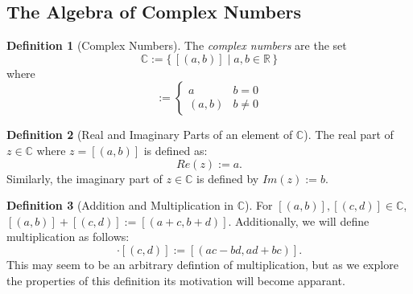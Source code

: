 \documentclass[hidelinks,12pt]{article}
\theoremstyle{definition}
\newtheorem{definition}{Definition}[section]
\begin{document}
  \subsection{The Algebra of Complex Numbers}
    \begin{definition} [Complex Numbers]
      \label{def:cmpnum}
      The \emph{complex numbers} are the set
      \begin{equation*}
        \mathbb{C} := \{\,[(a,b)] \mid a,b \in \mathbb{R}\,\}
      \end{equation*}
      where
      \begin{equation*}
        [(a,b)] :=
        \begin{cases}
          a & b = 0 \\
          (a,b) & b \neq 0
        \end{cases}
      \end{equation*}
    \end{definition}
    \begin{definition} [Real and Imaginary Parts of an element of $\mathbb{C}$]
      The real part of $z \in \mathbb{C}$ where $z=[(a,b)]$ is defined as:
      \begin{equation*}
        Re(z) := a.
      \end{equation*}
      Similarly, the imaginary part of $z \in \mathbb{C}$ is defined by $Im(z):=b$.
    \end{definition}
    \begin{definition} [Addition and Multiplication in $\mathbb{C}$]
      For $[(a,b)],[(c,d)]\in \mathbb{C}$, $[(a,b)]+[(c,d)]:=[(a+c,b+d)]$. Additionally, we will define multiplication as follows:
      \begin{equation*}
        [(a,b)]\cdot[(c,d)] := [(ac - bd, ad + bc)].
      \end{equation*}
      This may seem to be an arbitrary defintion of multiplication, but as we explore the properties of this definition its motivation will become apparant.
    \end{definition}
\end{document}
